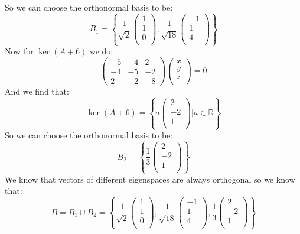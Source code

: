 \documentclass[11pt,a4paper]{article}
\theoremstyle{plain}
\newcommand{\R}{\mathbb{R}}
\begin{document}
	So we can choose the orthonormal basis to be:
	\[
		B_{1} = 
		\left\{
		\frac{1}{\sqrt{2}} \begin{pmatrix} 1\\ 1\\ 0\\ \end{pmatrix}, 
		\frac{1}{\sqrt{18}} \begin{pmatrix} -1\\ 1\\ 4\\ \end{pmatrix}
		\right\}
	\]
	Now for $\ker(A+6)$ we do:
	\[
		\begin{pmatrix}
		-5 & -4 & 2 \\
		-4 & -5 & -2 \\
		2 & -2 & -8 
		\end{pmatrix}
		\begin{pmatrix}
		x \\ y \\ z \\
		\end{pmatrix} = 0
	\]
	And we find that:
	\[
		\ker(A+6) = 
		\left\{
		a\begin{pmatrix} 2\\ -2\\ 1\\ \end{pmatrix}
		\biggr\vert a\in\R
		\right\}
	\]
	So we can choose the orthonormal basis to be:
	\[
		B_{2} = 
		\left\{
		\frac{1}{3}\begin{pmatrix} 2\\ -2\\ 1\\ \end{pmatrix}
		\right\}
	\]
	We know that vectors of different eigenspaces are always orthogonal
	so we know that:
	\[
		B = B_{1} \cup B_{2} = 
		\left\{
		\frac{1}{\sqrt{2}} \begin{pmatrix} 1\\ 1\\ 0\\ \end{pmatrix}, 
		\frac{1}{\sqrt{18}} \begin{pmatrix} -1\\ 1\\ 4\\ \end{pmatrix}, 
		\frac{1}{3}\begin{pmatrix} 2\\ -2\\ 1\\ \end{pmatrix}
		\right\}
	\]
\end{document}
